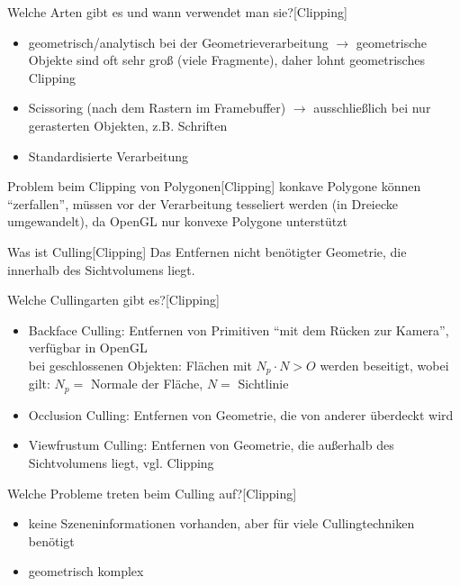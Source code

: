 \documentclass[a7paper,print]{kartei}
\begin{document}
\begin{karte}[CGIS]{Welche Arten gibt es und wann verwendet man sie?}[Clipping]
\begin{itemize}
\item geometrisch/analytisch bei der Geometrieverarbeitung $\rightarrow$ geometrische Objekte sind oft sehr groß (viele  Fragmente), daher lohnt geometrisches Clipping
\item Scissoring (nach dem Rastern im Framebuffer) $\rightarrow$ ausschließlich bei nur gerasterten Objekten, z.B. Schriften
\item Standardisierte Verarbeitung
\end{itemize}
\end{karte}

\begin{karte}[CGIS]{Problem beim Clipping von Polygonen}[Clipping]
konkave Polygone können "`zerfallen"', müssen vor der Verarbeitung tesseliert werden (in Dreiecke umgewandelt), da OpenGL nur konvexe Polygone unterstützt
\end{karte}

\begin{karte}[CGIS]{Was ist Culling}[Clipping]
Das Entfernen nicht benötigter Geometrie, die innerhalb des Sichtvolumens liegt.
\end{karte}

\begin{karte}[CGIS]{Welche Cullingarten gibt es?}[Clipping]
\begin{itemize}
\item Backface Culling: Entfernen von Primitiven "`mit dem Rücken zur Kamera"', verfügbar in OpenGL\\
bei geschlossenen Objekten: Flächen mit $N_p \cdot N > O$ werden beseitigt, wobei gilt: $N_p =$ Normale der Fläche, $N =$ Sichtlinie
\item Occlusion Culling: Entfernen von Geometrie, die von anderer überdeckt wird
\item Viewfrustum Culling: Entfernen von Geometrie, die außerhalb des Sichtvolumens liegt, vgl. Clipping
\end{itemize}
\end{karte}

\begin{karte}[CGIS]{Welche Probleme treten beim Culling auf?}[Clipping]
\begin{itemize}
\item keine Szeneninformationen vorhanden, aber für viele Cullingtechniken benötigt
\item geometrisch komplex
\end{itemize}
\end{karte}
\end{document}
